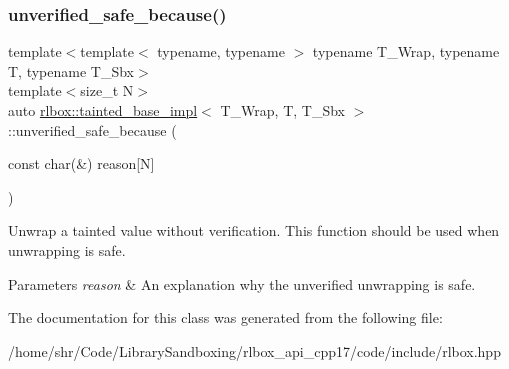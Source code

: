 \subsubsection{\texorpdfstring{unverified\+\_\+safe\+\_\+because()}{unverified\_safe\_because()}}
{\footnotesize\ttfamily template$<$template$<$ typename, typename $>$ typename T\+\_\+\+Wrap, typename T, typename T\+\_\+\+Sbx$>$ \\
template$<$size\+\_\+t N$>$ \\
auto \hyperlink{classrlbox_1_1tainted__base__impl}{rlbox\+::tainted\+\_\+base\+\_\+impl}$<$ T\+\_\+\+Wrap, T, T\+\_\+\+Sbx $>$\+::unverified\+\_\+safe\+\_\+because (\begin{DoxyParamCaption}\item[{const char(\&)}]{reason\mbox{[}\+N\mbox{]} }\end{DoxyParamCaption})\hspace{0.3cm}{\ttfamily [inline]}}



Unwrap a tainted value without verification. This function should be used when unwrapping is safe. 


\begin{DoxyParams}{Parameters}
{\em reason} & An explanation why the unverified unwrapping is safe. \\
\hline
\end{DoxyParams}


The documentation for this class was generated from the following file\+:\begin{DoxyCompactItemize}
\item 
/home/shr/\+Code/\+Library\+Sandboxing/rlbox\+\_\+api\+\_\+cpp17/code/include/rlbox.\+hpp\end{DoxyCompactItemize}
